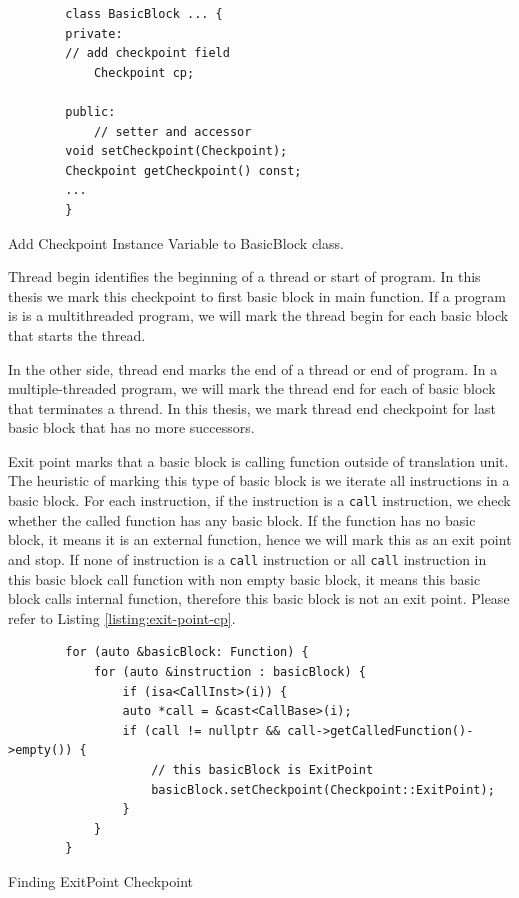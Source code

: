\begin{listing}[htbp]
    \begin{verbatim}
        class BasicBlock ... {
        private:
        // add checkpoint field
            Checkpoint cp;

        public:
            // setter and accessor
        void setCheckpoint(Checkpoint);
        Checkpoint getCheckpoint() const;
        ...
        }
    \end{verbatim}
    \caption{Add Checkpoint Instance Variable to BasicBlock class.}    
    \label{listing:checkpoint}
\end{listing}

Thread begin identifies the beginning of a thread or start of program. In this thesis we mark this checkpoint to 
first basic block in main function. If a program is is a multithreaded program, we will mark the thread begin for each
basic block that starts the thread.

In the other side, thread end marks the end of a thread or end of program. In a multiple-threaded program, we will 
mark the thread end for each of basic block that terminates a thread. In this thesis, we mark thread end checkpoint for last 
basic block that has no more successors.

Exit point marks that a basic block is calling function outside of translation unit. The heuristic
of marking this type of basic block is we iterate all instructions in a basic block. For each instruction, if the 
instruction is a \texttt{call} instruction, we check whether the called function has any basic block. If the function has no basic block, 
it means it is an external function, hence we will mark this as an exit point and stop. If none of instruction is a \texttt{call} instruction or all
\texttt{call} instruction in this basic block call function with non empty basic block, it means this basic block calls
internal function, therefore this basic block is not an exit point. Please refer to Listing \ref{listing:exit-point-cp}.

\begin{listing}[htbp]
    \begin{verbatim}
        for (auto &basicBlock: Function) {
            for (auto &instruction : basicBlock) {
                if (isa<CallInst>(i)) {
                auto *call = &cast<CallBase>(i);
                if (call != nullptr && call->getCalledFunction()->empty()) {
                    // this basicBlock is ExitPoint
                    basicBlock.setCheckpoint(Checkpoint::ExitPoint);
                } 
            }
        } 
    \end{verbatim}
    \caption{Finding ExitPoint Checkpoint}    
    \label{listing:exit-point-cp}
\end{listing}

